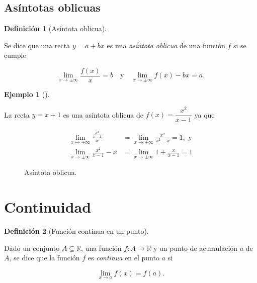 \documentclass[
  a4paper,
]{scrreport}
\theoremstyle{definition}
\newtheorem{example}{Ejemplo}[chapter]
\theoremstyle{plain}
\theoremstyle{definition}
\newtheorem{definition}{Definición}[chapter]
\theoremstyle{definition}
\theoremstyle{plain}
\theoremstyle{plain}
\theoremstyle{remark}
\begin{document}
\subsection{Asíntotas oblicuas}\label{asuxedntotas-oblicuas}

\begin{definition}[Asíntota
oblicua]\protect\hypertarget{def-asintota-oblicua}{}\label{def-asintota-oblicua}

Se dice que una recta \(y=a+bx\) es una \emph{asíntota oblicua} de una
función \(f\) si se cumple

\[\lim_{x\to \pm\infty}\frac{f(x)}{x}=b \quad \mbox{y} \quad \lim_{x\to \pm\infty}f(x)-bx=a.\]

\end{definition}

\begin{example}[]\protect\hypertarget{exm-asintota-oblicua}{}\label{exm-asintota-oblicua}

La recta \(y=x+1\) es una asíntota oblicua de \(f(x)=\dfrac{x^2}{x-1}\)
ya que

\begin{align*}
\lim_{x\to \pm\infty}\frac{\frac{x^2}{x-1}}{x}&=
\lim_{x\to \pm\infty}\frac{x^2}{x^2-x} = 1, \mbox{ y}\\
\lim_{x\to \pm\infty}\frac{x^2}{x-1}-x &=
\lim_{x\to \pm\infty}1+\frac{x}{x-1} = 1
\end{align*}

\begin{figure}
\centering

\caption{Asíntota oblicua.}
\end{figure}

\end{example}

\section{Continuidad}\label{continuidad}

\begin{definition}[Función continua en un
punto]\protect\hypertarget{def-funcion-continua-punto}{}\label{def-funcion-continua-punto}

Dado un conjunto \(A\subseteq \mathbb{R}\), una función
\(f:A\to \mathbb{R}\) y un punto de acumulación \(a\) de \(A\), se dice
que la función \(f\) es \emph{continua} en el punto \(a\) si

\[\lim_{x\to a}f(x)=f(a).\]

\end{definition}
\end{document}
